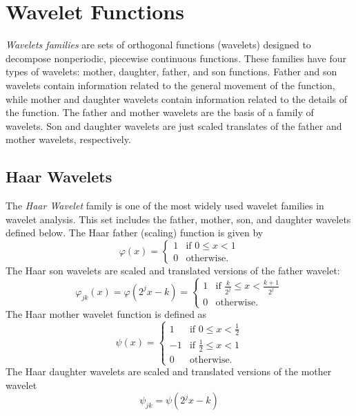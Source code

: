 
\section*{Wavelet Functions}

\emph{Wavelets families} are sets of orthogonal functions (wavelets) designed to decompose nonperiodic, piecewise continuous functions.
These families have four types of wavelets: mother, daughter, father, and son functions.
Father and son wavelets contain information related to the general movement of the function, while mother and daughter wavelets contain information related to the details of the function.
The father and mother wavelets are the basis of a family of wavelets.
Son and daughter wavelets are just scaled translates of the father and mother wavelets, respectively.

\subsection*{Haar Wavelets}

The \emph{Haar Wavelet} family is one of the most widely used wavelet families in wavelet analysis.
This set includes the father, mother, son, and daughter wavelets defined below.
The Haar father (scaling) function is given by
\[
\varphi(x) =
 \begin{cases}
 1 & \text{if } 0 \leq x < 1 \\
 0 & \text{otherwise.}
 \end{cases}
\]
The Haar son wavelets are scaled and translated versions of the father wavelet:
\[
\varphi_{jk}(x)=\varphi(2^jx-k) =
 \begin{cases}
 1 & \text{if }\frac{k}{2^j} \leq x < \frac{k+1}{2^j} \\
 0 & \text{otherwise.}
 \end{cases}
\]
The Haar mother wavelet function is defined as
\[
\psi(x) =
 \begin{cases}
  1 & \text{if } 0 \leq x < \frac{1}{2} \\
  -1 & \text{if } \frac{1}{2} \leq x < 1 \\
  0 & \text{otherwise.}
 \end{cases}
\]
The Haar daughter wavelets are scaled and translated versions of the mother wavelet
\[
\psi_{jk}=\psi(2^jx-k)
\]

